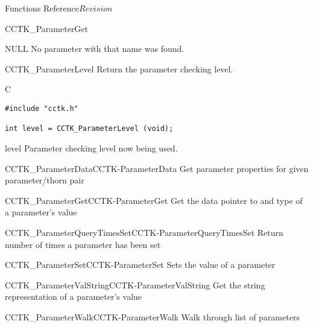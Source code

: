 \begin{cactuspart}{ Functions Reference}{}{$Revision$}
\begin{FunctionDescription}{CCTK\_ParameterGet}
\begin{ErrorSection}
\begin{Error}{NULL}
No parameter with that name was found.
\end{Error}
\end{ErrorSection}
\end{FunctionDescription}


\begin{FunctionDescription}{CCTK\_ParameterLevel}
\label{CCTK-ParameterLevel}
Return the parameter checking level.

\begin{SynopsisSection}
\begin{Synopsis}{C}
\begin{verbatim}
#include "cctk.h"

int level = CCTK_ParameterLevel (void);
\end{verbatim}
\end{Synopsis}
\end{SynopsisSection}

\begin{ResultSection}
\begin{Result}{level}
Parameter checking level now being used.
\end{Result}
\end{ResultSection}

\begin{SeeAlsoSection}
\begin{SeeAlso2}{CCTK\_ParameterData}{CCTK-ParameterData}
  Get parameter properties for given parameter/thorn pair
\end{SeeAlso2}
\begin{SeeAlso2}{CCTK\_ParameterGet}{CCTK-ParameterGet}
  Get the data pointer to and type of a parameter's value
\end{SeeAlso2}
\begin{SeeAlso2}{CCTK\_ParameterQueryTimesSet}{CCTK-ParameterQueryTimesSet}
  Return number of times a parameter has been set
\end{SeeAlso2}
\begin{SeeAlso2}{CCTK\_ParameterSet}{CCTK-ParameterSet}
  Sets the value of a parameter
\end{SeeAlso2}
\begin{SeeAlso2}{CCTK\_ParameterValString}{CCTK-ParameterValString}
  Get the string representation of a parameter's value
\end{SeeAlso2}
\begin{SeeAlso2}{CCTK\_ParameterWalk}{CCTK-ParameterWalk}
  Walk through list of parameters
\end{SeeAlso2}
\end{SeeAlsoSection}
\end{FunctionDescription}



\end{cactuspart}
